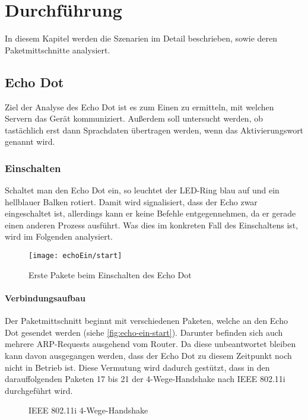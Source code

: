 \section{Durchführung}\label{sec:durchfuehrung}
In diesem Kapitel werden die Szenarien im Detail beschrieben, sowie deren Paketmittschnitte analysiert.

\subsection{Echo Dot}
Ziel der Analyse des Echo Dot ist es zum Einen zu ermitteln, mit welchen Servern das Gerät kommuniziert.
Außerdem soll untersucht werden, ob tastächlich erst dann Sprachdaten übertragen werden, wenn das Aktivierungswort genannt wird.

\subsubsection{Einschalten}
Schaltet man den Echo Dot ein, so leuchtet der LED-Ring blau auf und ein hellblauer Balken rotiert.
Damit wird signalisiert, dass der Echo zwar eingeschaltet ist, allerdings kann er keine Befehle entgegennehmen,
da er gerade einen anderen Prozess ausführt.
Was dies im konkreten Fall des Einschaltens ist, wird im Folgenden analysiert.

\begin{figure}[h!]
    \centering
    \texttt{[image: echoEin/start]}
    \caption{Erste Pakete beim Einschalten des Echo Dot}\label{fig:echo-ein-start}
\end{figure}

\paragraph{Verbindungsaufbau}
Der Paketmittschnitt beginnt mit verschiedenen Paketen, welche an den Echo Dot gesendet werden (siehe \autoref{fig:echo-ein-start}).
Darunter befinden sich auch mehrere ARP-Requests ausgehend vom Router.
Da diese unbeantwortet bleiben kann davon ausgegangen werden, dass der Echo Dot zu diesem Zeitpunkt noch nicht in Betrieb ist.
Diese Vermutung wird dadurch gestützt,
dass in den darauffolgenden Paketen 17 bis 21 der 4-Wege-Handshake \cite[S.~169f]{Bless2006} nach IEEE 802.11i durchgeführt wird.

\begin{figure}[ht!]
    \centering
    \resizebox{0.75\textwidth}{!}{
        
    }
    \caption{IEEE 802.11i 4-Wege-Handshake}
    \label{fig:handshake}
\end{figure}

